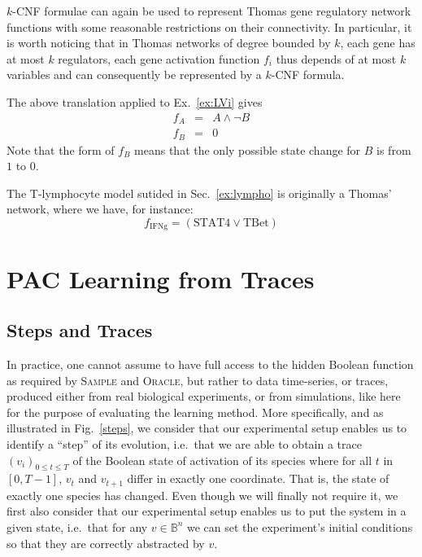 \documentclass{llncs}
\begin{document}
$k$-CNF formulae can again be used to represent Thomas gene regulatory network functions with some reasonable restrictions on their connectivity.
In particular, it is worth noticing that in Thomas networks of degree bounded by $k$,
each gene has at most $k$ regulators, each gene activation function $f_i$ thus depends of at most $k$ variables
and can consequently be represented by a $k$-CNF formula.

\begin{example}
   The above translation applied to
   Ex.~\ref{ex:LVi} gives
   \begin{eqnarray*}
   f_A &=& A \wedge\neg B\\
   f_B &=& 0
   \end{eqnarray*}
   Note that the form of $f_B$ means that the only possible state change
   for $B$ is from $1$ to $0$. 
\end{example}

\begin{example}
   The T-lymphocyte model sutided in Sec.~\ref{ex:lympho} is originally a Thomas' network, where we have, for
   instance:
   \[f_\text{IFNg}=(\text{STAT4}\vee \text{TBet})\]
\end{example}

\section{PAC Learning from Traces} %


\subsection{Steps and Traces}

In practice, one cannot assume to have full access to the hidden Boolean function as required by
\textsc{Sample} and \textsc{Oracle}, but rather to data time-series, or traces,
produced either from real biological experiments, or from simulations, like here for the purpose of evaluating the learning method.
More specifically, and as illustrated in Fig.~\ref{steps}, we consider that our experimental setup enables us to identify a ``step'' of its evolution, i.e.~that we are able to obtain a trace $(v_i)_{0 \leq t \leq T}$ of the Boolean state of activation of its species where for all $t$ in $[0,T-1]$, $v_t$ and $v_{t+1}$ differ in exactly one coordinate. That is, the state of exactly one species has changed.
Even though we will finally not require it, we first also consider that our experimental setup enables us to put the system in a given state, i.e.~that for any $v \in \mathbb{B}^n$ we can set the experiment's initial conditions so that they are correctly abstracted by $v$.
\end{document}
